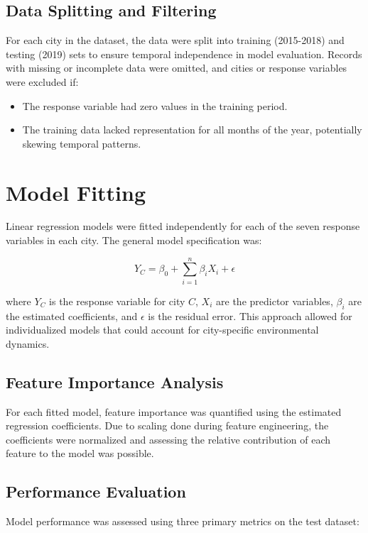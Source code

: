 \documentclass[twoside,11pt]{article}
\begin{document}
\subsection{Data Splitting and Filtering}

For each city in the dataset, the data were split into training (2015-2018) and testing (2019) sets to ensure temporal independence in model evaluation. Records with missing or incomplete data were omitted, and cities or response variables were excluded if:

\begin{itemize}
  \item The response variable had zero values in the training period.
  \item The training data lacked representation for all months of the year, potentially skewing temporal patterns.
\end{itemize}

\section{Model Fitting}

Linear regression models were fitted independently for each of the seven response variables in each city. The general model specification was:

\[
Y_{C} = \beta_{0} + \sum_{i=1}^{n} \beta_{i} X_{i} + \epsilon
\]

where $Y_{C}$ is the response variable for city $C$, $X_{i}$ are the predictor variables, $\beta_{i}$ are the estimated coefficients, and $\epsilon$ is the residual error. This approach allowed for individualized models that could account for city-specific environmental dynamics.

\subsection{Feature Importance Analysis}

For each fitted model, feature importance was quantified using the estimated regression coefficients. Due to scaling done during feature engineering, the coefficients were normalized and assessing the relative contribution of each feature to the model was possible.

\subsection{Performance Evaluation}

Model performance was assessed using three primary metrics on the test dataset:
\end{document}
